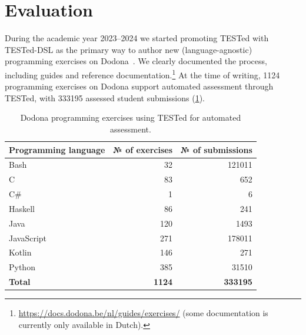 \documentclass[../main]{subfiles}
\begin{document}
\section{Evaluation}\label{sec:dsl-evaluation}

During the academic year 2023--2024 we started promoting TESTed with TESTed-DSL as the primary way to author new (language-agnostic) programming exercises on Dodona~\autocite{vanpetegemDodonaLearnCode2023}.
We clearly documented the process, including guides and reference documentation.\footnote{\url{https://docs.dodona.be/nl/guides/exercises/} (some documentation is currently only available in Dutch).}
At the time of writing, \num{1124} programming exercises on Dodona support automated assessment through TESTed, with \num{333195} assessed student submissions (\cref{tab:exercises-on-dodona}).

\begin{table}
    \centering%
    \caption{Dodona programming exercises using TESTed for automated assessment.\label{tab:exercises-on-dodona}}%
    \small%
    \begin{tabular}{|l|r|r|}
        \hline
        \textbf{Programming language}   & \textbf{№ of exercises}   & \textbf{№ of submissions} \\
        \hline
        Bash                            & \num{32}                  & \num{121011}              \\
        C                               & \num{83}                  & \num{652}                 \\
        C\#                             & \num{1}                   & \num{6}                   \\
        Haskell                         & \num{86}                  & \num{241}                 \\
        Java                            & \num{120}                 & \num{1493}                \\
        JavaScript                      & \num{271}                 & \num{178011}              \\
        Kotlin                          & \num{146}                 & \num{271}                 \\
        Python                          & \num{385}                 & \num{31510}               \\
        \hline
        \textbf{Total}                  & \textbf{\num{1124}}       & \textbf{\num{333195}}     \\
        \hline
    \end{tabular}
\end{table}
\end{document}
